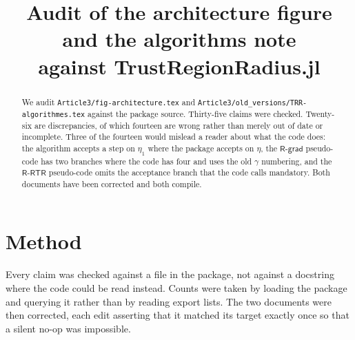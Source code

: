 \documentclass[11pt,a4paper]{article}
\title{Audit of the architecture figure and the algorithms note\\
       \large against \textsf{TrustRegionRadius.jl}}
\author{}
\date{}
\providecommand{\Rgrad}{\textsf{R-grad}}
\providecommand{\Rrtr}{\textsf{R-RTR}}
\begin{document}
\maketitle

\begin{abstract}
We audit \texttt{Article3/fig-architecture.tex} and
\texttt{Article3/old\_versions/TRR-algorithmes.tex} against the package source.
Thirty-five claims were checked. Twenty-six are discrepancies, of which fourteen
are wrong rather than merely out of date or incomplete. Three of the fourteen
would mislead a reader about what the code does:
the algorithm accepts a step on $\eta_1$ where the package accepts on $\eta$, the
$\Rgrad$ pseudo-code has two branches where the code has four and uses the old
$\gamma$ numbering, and the $\Rrtr$ pseudo-code omits the acceptance branch that
the code calls mandatory. Both documents have been corrected and both compile.
\end{abstract}

\tableofcontents

\section{Method}\label{sec: method}

Every claim was checked against a file in the package, not against a docstring
where the code could be read instead. Counts were taken by loading the package
and querying it rather than by reading export lists. The two documents were then
corrected, each edit asserting that it matched its target exactly once so that a
silent no-op was impossible.
\end{document}

